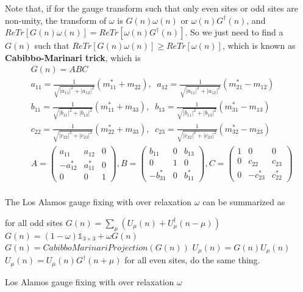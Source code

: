 Note that, if for the gauge transform such that only even sites or odd sites are non-unity, the transform of $\omega$ is $G(n)\omega (n)$ or $\omega (n)G^{\dagger}(n)$, and $ReTr[G(n)\omega (n)]=ReTr[\omega (n)G^{\dagger}(n)]$. So we just need to find a $G(n)$ such that $ReTr[G(n)\omega (n)]\geq ReTr[\omega (n)]$, which is known as \textbf{Cabibbo-Marinari trick}, which is
\begin{equation}
\begin{split}
&G(n)=ABC\\
&a_{11}=\frac{1}{\sqrt{|a_{11}|^2+|a_{12}|^2}}(m_{11}^*+m_{22}),\;\;a_{12}=\frac{1}{\sqrt{|a_{11}|^2+|a_{12}|^2}}(m_{21}^*-m_{12})\\
&b_{11}=\frac{1}{\sqrt{|b_{11}|^2+|b_{13}|^2}}(m_{11}^*+m_{33}),\;\;b_{13}=\frac{1}{\sqrt{|b_{11}|^2+|b_{13}|^2}}(m_{31}^*-m_{13})\\
&c_{22}=\frac{1}{\sqrt{|c_{22}|^2+|c_{23}|^2}}(m_{22}^*+m_{33}),\;\;c_{23}=\frac{1}{\sqrt{|c_{22}|^2+|c_{23}|^2}}(m_{32}^*-m_{23})\\
&A=\left(\begin{array}{ccc} a_{11} & a_{12} & 0 \\ -a_{12}^* & a_{11}^* & 0 \\ 0 & 0 & 1 \end{array}\right),B=\left(\begin{array}{ccc} b_{11} & 0 & b_{13} \\ 0 & 1 & 0 \\ -b_{31}^* & 0 & b_{11}^* \end{array}\right),C=\left(\begin{array}{ccc} 1 & 0 & 0 \\ 0 & c_{22} & c_{23} \\ 0 & -c_{23}^* & c_{22}^* \end{array}\right)\\
\end{split}
\end{equation}

The Los Alamos gauge fixing with over relaxation $\omega $ can be summarized as
\begin{algorithm}[H]
\begin{algorithmic}
        \Return
    \EndIf
    \State for all odd sites
    \State $G(n)=\sum _{\mu}\left(U_{\mu}(n)+U_{\mu}^{\dagger}(n-\mu)\right)$
    \State $G(n)=(1-\omega)\mathbb{1}_{3\times 3}+\omega G(n)$
    \State $G(n)=CabibboMarinariProjection(G(n))$
        \State $U_{\mu} (n)=G(n)U_{\mu} (n)$
    \Else
        \State $U_{\mu} (n)=U_{\mu} (n)G^{\dagger}(n+\mu)$
    \EndIf
    \State for all even sites, do the same thing.
\EndFor
\end{algorithmic}
\caption{\label{alg.LosAlamosGaugeFixing}Los Alamos gauge fixing with over relaxation $\omega $}
\end{algorithm}

